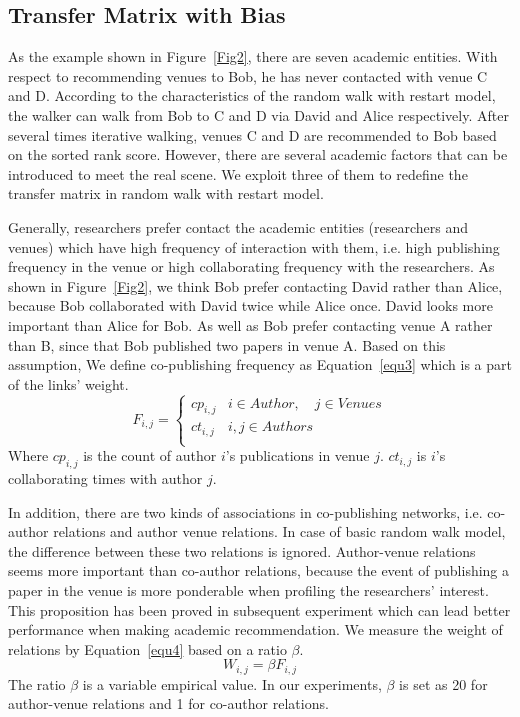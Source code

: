 \documentclass[9pt]{acm_proc_article-sp}
\begin{document}
\subsection{Transfer Matrix with Bias}
As the example shown in Figure~\ref{Fig2}, there are seven academic entities. With respect to recommending venues to Bob, he has never contacted with venue C and D. According to the characteristics of the random walk with restart model, the walker can walk from Bob to C and D via David and Alice respectively. After several times iterative walking, venues C and D are recommended to Bob based on the sorted rank score. However, there are several academic factors that can be introduced to meet the real scene. We exploit three of them to redefine the transfer matrix in random walk with restart model.

Generally, researchers prefer contact the academic entities (researchers and venues) which have high frequency of interaction with them, i.e. high publishing frequency in the venue or high collaborating frequency with the researchers. As shown in Figure~\ref{Fig2}, we think Bob prefer contacting David rather than Alice, because Bob collaborated with David twice while Alice once. David looks more important than Alice for Bob. As well as Bob prefer contacting venue A rather than B, since that Bob published two papers in venue A. Based on this assumption, We define co-publishing frequency as Equation~\ref{equ3} which is a part of the links' weight.
\begin{equation}
\label{equ3}
F_{i,j}=\left\{\begin{array}{ll}
cp_{i,j} & i\in Author,\quad j\in Venues\\
ct_{i,j} & i,j\in Authors\\
\end{array}\right.
\end{equation}
Where $cp_{i,j}$ is the count of author $i$'s publications in venue $j$. $ct_{i,j}$ is $i$'s collaborating times with author $j$.

In addition, there are two kinds of associations in co-publishing networks, i.e. co-author relations and author venue relations. In case of basic random walk model, the difference between these two relations is ignored. Author-venue relations seems more important than co-author relations, because the event of publishing a paper in the venue is more ponderable when profiling the researchers' interest. This proposition has been proved in subsequent experiment which can lead better performance when making academic recommendation. We measure the weight of relations by Equation~\ref{equ4} based on a ratio $\beta$.
\begin{equation}
\label{equ4}
W_{i,j}=\beta F_{i,j}
\end{equation}
The ratio $\beta$ is a variable empirical value. In our experiments, $\beta$ is set as 20 for author-venue relations and 1 for co-author relations.
\end{document}
